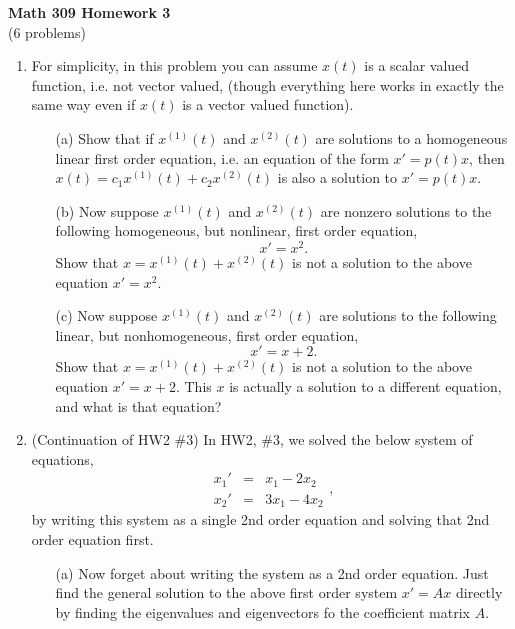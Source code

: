 \documentclass[11pt]{article}
\theoremstyle{definition}
\begin{document}
\begin{center}
\textbf{Math 309 Homework 3}\\
(6 problems)
\end{center}
\vspace{0.15in}


\begin{enumerate}[leftmargin=*]

\item For simplicity, in this problem you can assume $x(t)$ is a scalar valued function, i.e. not vector valued, (though everything here works in exactly the same way even if $x(t)$ is a vector valued function).

\begin{itemize}
\item [(a)] Show that if $x^{(1)}(t)$ and $x^{(2)}(t)$ are solutions to a homogeneous linear first order equation, i.e. an equation of the form $x'=p(t)x$, then $x(t)=c_1x^{(1)}(t)+c_2x^{(2)}(t)$ is also a solution to $x'=p(t)x$.\\

\item [(b)] Now suppose $x^{(1)}(t)$ and $x^{(2)}(t)$ are nonzero solutions to the following homogeneous, but nonlinear, first order equation,
\[
x' = x^2.
\] 
Show that $x=x^{(1)}(t)+x^{(2)}(t)$ is not a solution to the above equation $x'=x^2$.\\

\item [(c)] Now suppose $x^{(1)}(t)$ and $x^{(2)}(t)$ are solutions to the following linear, but nonhomogeneous, first order equation,
\[
x'=x+2.
\]
Show that $x=x^{(1)}(t)+x^{(2)}(t)$ is not a solution to the above equation $x'=x+2$.  This $x$ is actually a solution to a different equation, and what is that equation?  \\
\end{itemize}

 \item  (Continuation of HW2 \#3) In HW2, \#3, we solved the below system of equations,
\[
\begin{array}{lll}
x_1' & = & x_1-2x_2  \\
x_2' & = & 3x_1-4x_2
\end{array},
\]
by writing this system as a single 2nd order equation and solving that 2nd order equation first. 

\begin{itemize}
\item [(a)] Now forget about writing the system as a 2nd order equation.   Just find the general solution to the above first order system $x'=Ax$ directly by finding the eigenvalues and eigenvectors fo the coefficient matrix $A$.


\end{itemize}
\end{enumerate}
\end{document}
